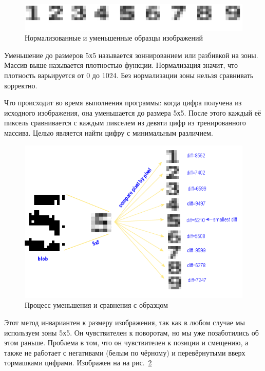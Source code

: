 \begin{figure}[ht!]
  \centering
  \includegraphics[width=\textwidth]{inc/raster/design2-10.png}
  \caption{Нормализованные и уменьшенные образцы изображений}
  \label{fig:fig210}
\end{figure}

Уменьшение до размеров 5х5 называется зоннированием или разбивкой на зоны. Массив выше называется плотностью функции.
Нормализация значит, что плотность варьируется от 0 до 1024. Без нормализации зоны нельзя сравнивать корректно.

Что происходит во время выполнения программы: когда цифра получена из исходного изображения, она уменьшается до размера 5х5. После этого каждый её пиксель сравнивается с каждым пикселем из девяти цифр из тренированного массива. Целью является найти цифру с минимальным различием. 

\begin{figure}[ht!]
  \centering
  \includegraphics[width=\textwidth]{inc/raster/design2-11.png}
  \caption{Процесс уменьшения и сравнения с образцом}
  \label{fig:fig211}
\end{figure}
Этот метод инвариантен к размеру изображения, так как в любом случае мы используем зоны 5х5. Он чувствителен к поворотам, но мы уже позаботились об этом раньше. Проблема в том, что он чувствителен к позиции и смещению, а также не работает с негативами (белым по чёрному) и перевёрнутыми вверх тормашками цифрами. Изображен на на рис.~\ref{fig:fig211}

